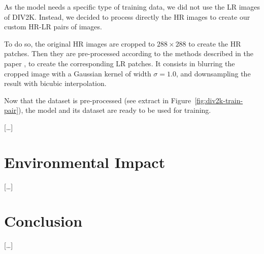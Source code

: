 \documentclass{article}
\begin{document}
{    \bigskip

    As the model needs a specific type of training data, we did not use the LR images of DIV2K. Instead, we decided to process directly the HR images to create our custom HR-LR pairs of images.

    To do so, the original HR images are cropped to $288 \times 288$ to create the HR patches. Then they are pre-processed according to the methods described in the paper \citep{sr}, to create the corresponding LR patches. It consists in blurring the cropped image with a Gaussian kernel of width $\sigma = 1.0$, and downsampling the result with bicubic interpolation.

    Now that the dataset is pre-processed (see extract in Figure~\ref{fig:div2k-train-pair}), the model and its dataset are ready to be used for training.

    \bigskip

    […]
}

{
    \section{Environmental Impact}
    \label{sec:env-impact}

    […]
}

{
    \section{Conclusion}
    \label{sec:conclusion}

    […]
}

{
    
}
\end{document}
